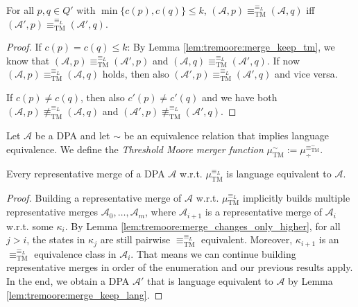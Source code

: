 \begin{lem}
	For all $p, q \in Q'$ with $\min \{c(p), c(q)\} \leq k$, $(\mathcal{A}, p) \equiv^{\equiv_L}_\text{TM} (\mathcal{A}, q)$ iff \linebreak $(\mathcal{A}', p) \equiv^{\equiv_L}_\text{TM} (\mathcal{A}', q)$.
	\label{lem:tremoore:merge_changes_only_higher}
\end{lem}

\begin{proof}
	If $c(p) = c(q) \leq k$: By Lemma \ref{lem:tremoore:merge_keep_tm}, we know that $(\mathcal{A}, p) \equiv^{\equiv_L}_\text{TM} (\mathcal{A}', p)$ and $(\mathcal{A}, q) \equiv^{\equiv_L}_\text{TM} (\mathcal{A}', q)$. If now $(\mathcal{A}, p) \equiv^{\equiv_L}_\text{TM} (\mathcal{A}, q)$ holds, then also $(\mathcal{A}', p) \equiv^{\equiv_L}_\text{TM} (\mathcal{A}', q)$ and vice versa.
	
	If $c(p) \neq c(q)$, then also $c'(p) \neq c'(q)$ and we have both $(\mathcal{A}, p) \not\equiv^{\equiv_L}_\text{TM} (\mathcal{A}, q)$ and $(\mathcal{A}', p) \not\equiv^{\equiv_L}_\text{TM} (\mathcal{A}', q)$.
\end{proof}

\vspace{10pt}

\begin{defn}
	Let $\mathcal{A}$ be a DPA and let $\sim$ be an equivalence relation that implies language equivalence. We define the \emph{Threshold Moore merger function} $\mu_\text{TM}^\sim := \mu_\div^{\equiv^\sim_\text{TM}}$.
\end{defn}

\begin{theorem}
	Every representative merge of a DPA $\mathcal{A}$ w.r.t. $\mu_\text{TM}^{\equiv_L}$ is language equivalent to $\mathcal{A}$.
\end{theorem}

\begin{proof}
	Building a representative merge of $\mathcal{A}$ w.r.t. $\mu_\text{TM}^{\equiv_L}$ implicitly builds multiple representative merges $\mathcal{A}_0, \dots, \mathcal{A}_m$, where $\mathcal{A}_{i+1}$ is a representative merge of $\mathcal{A}_i$ w.r.t. some $\kappa_i$. By Lemma \ref{lem:tremoore:merge_changes_only_higher}, for all $j > i$, the states in $\kappa_j$ are still pairwise $\equiv^{\equiv_L}_\text{TM}$ equivalent. Moreover, $\kappa_{i+1}$ is an $\equiv^{\equiv_L}_\text{TM}$ equivalence class in $\mathcal{A}_i$. That means we can continue building representative merges in order of the enumeration and our previous results apply. In the end, we obtain a DPA $\mathcal{A}'$ that is language equivalent to $\mathcal{A}$ by Lemma \ref{lem:tremoore:merge_keep_lang}.
\end{proof}



